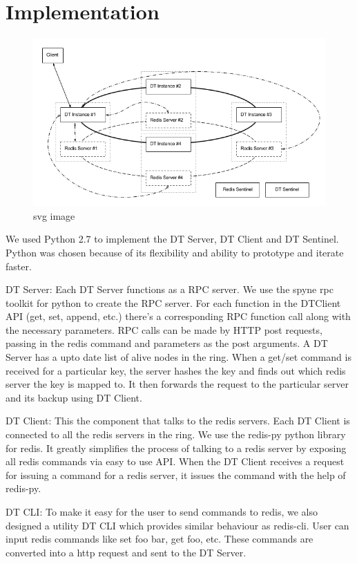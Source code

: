 \documentclass[10pt,twocolumn,letterpaper]{article}
\begin{document}
\section{Implementation} \label{implementation}
\begin{figure}[htb]
  \centering
  \includegraphics[scale=0.6]{impl1}
  \caption{svg image}
\end{figure}


We used Python 2.7 to implement the DT Server, DT Client and DT Sentinel. Python was chosen because of its flexibility and ability to prototype and iterate faster. 

DT Server: Each DT Server functions as a RPC server. We use the spyne rpc toolkit for python to create the RPC server. For each function in the DTClient API (get, set, append, etc.) there's a corresponding RPC function call along with the necessary parameters. RPC calls can be made by HTTP post requests, passing in the redis command and parameters as the post arguments. A DT Server has a upto date list of alive nodes in the ring. When a get/set command is received for a particular key, the server hashes the key and finds out which redis server the key is mapped to. It then forwards the request to the particular server and its backup using DT Client.

DT Client: This the component that talks to the redis servers. Each DT Client is connected to all the redis servers in the ring. We use the redis-py python library for redis. It greatly simplifies the process of talking to a redis server by exposing all redis commands via easy to use API. When the DT Client receives a request for issuing a command for a redis server, it issues the command with the help of redis-py.

DT CLI: To make it easy for the user to send commands to redis, we also designed a utility DT CLI which provides similar behaviour as redis-cli. User can input redis commands like set foo bar, get foo, etc. These commands are converted into a http request and sent to the DT Server. 
\end{document}
